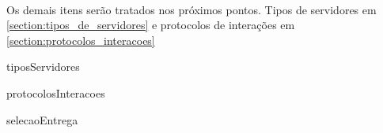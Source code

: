 \paragraph{}
Os demais itens ser\~ao tratados nos pr\'oximos pontos. Tipos de servidores em \ref{section:tipos_de_servidores} e protocolos de intera\c{c}\~oes em \ref{section:protocolos_interacoes}

{tiposServidores}

{protocolosInteracoes}

{selecaoEntrega}
